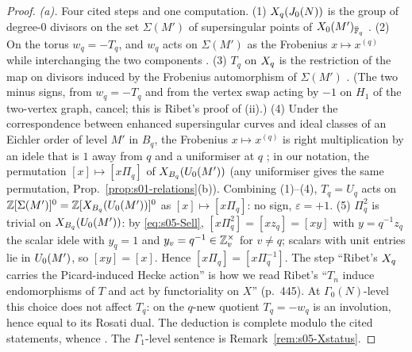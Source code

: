 \begin{proof}
\emph{(a).} Four cited steps and one computation.
(1) $X_q(J_0(N))$ is the group of degree-$0$ divisors on the set $\Sigma(M')$ of supersingular points of $X_0(M')_{\bar{\mathbb{F}}_q}$
.
(2) On the torus $w_q=-T_q$, and $w_q$ acts on $\Sigma(M')$ as the Frobenius $x\mapsto x^{(q)}$ while interchanging the two
components .
(3) $T_q$ on $X_q$ is the restriction of the map on divisors induced by the Frobenius automorphism of $\Sigma(M')$
. (The two minus signs, from
$w_q=-T_q$ and from the vertex swap acting by $-1$ on $H_1$ of the two-vertex graph, cancel; this is Ribet's proof of (ii).)
(4) Under the correspondence between enhanced supersingular curves and ideal classes of an Eichler order of level $M'$ in $B_q$,
the Frobenius $x\mapsto x^{(q)}$ is right multiplication by an idele that is $1$ away from $q$ and a uniformiser at $q$
; in our notation, the
permutation $[x]\mapsto[x\Pi_q]$ of $X_{B_q}(U_0(M'))$ (any uniformiser gives the same permutation, Prop.~\ref{prop:s01-relations}(b)).
Combining (1)--(4), $T_q=U_q$ acts on $\mathbb{Z}[\Sigma(M')]^0=\mathbb{Z}[X_{B_q}(U_0(M'))]^0$ as $[x]\mapsto[x\Pi_q]$: no sign, $\varepsilon=+1$.
(5) $\Pi_q^2$ is trivial on $X_{B_q}(U_0(M'))$: by \eqref{eq:s05-Sell}, $[x\Pi_q^2]=[xz_q]=[xy]$ with $y=q^{-1}z_q$ the scalar idele with
$y_q=1$ and $y_v=q^{-1}\in\mathbb{Z}_v^\times$ for $v\ne q$; scalars with unit entries lie in $U_0(M')$, so $[xy]=[x]$. Hence
$[x\Pi_q]=[x\Pi_q^{-1}]$.
The step ``Ribet's $X_q$ carries the Picard-induced Hecke action'' is how we read Ribet's ``$T_n$ induce endomorphisms of $T$ and act by
functoriality on $X$'' (p.~445). At $\Gamma_0(N)$-level this choice does not affect $T_q$: on the $q$-new quotient $T_q=-w_q$ is an
involution, hence equal to its Rosati dual. The deduction is complete modulo the cited statements, whence \stpmc.
The $\Gamma_1$-level sentence is Remark~\ref{rem:s05-Xstatus}.


\end{proof}
